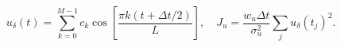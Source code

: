 \documentclass[12pt]{article}
\begin{document}
\fontsize{22}{28}\selectfont\[u_\delta(t)=\sum_{k=0}^{M-1}c_k\cos\!\left[\frac{\pi k(t+\Delta t/2)}{L}\right],\quad J_u=\frac{w_u\Delta t}{\sigma_u^2}\sum_j u_\delta(t_j)^2.\]
\end{document}
